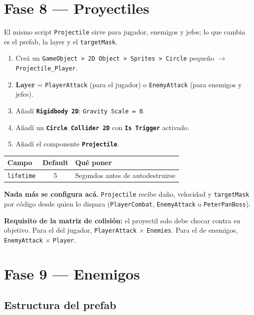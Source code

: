 \documentclass[a4paper,12pt]{article}
\newcommand{\code}[1]{\texttt{#1}}
\begin{document}
\section{Fase 8 --- Proyectiles}

El mismo script \code{Projectile} sirve para jugador, enemigos y jefes; lo que cambia es el
prefab, la layer y el \code{targetMask}.

\begin{enumerate}
    \item Creá un \code{GameObject > 2D Object > Sprites > Circle} pequeño $\to$ \code{Projectile\_Player}.
    \item \textbf{Layer} = \code{PlayerAttack} (para el jugador) o \code{EnemyAttack} (para enemigos y jefes).
    \item Añadí \textbf{\code{Rigidbody 2D}}: \code{Gravity Scale = 0}.
    \item Añadí un \textbf{\code{Circle Collider 2D}} con \textbf{\code{Is Trigger}} activado.
    \item Añadí el componente \textbf{\code{Projectile}}.
\end{enumerate}

\begin{center}
\begin{tabular}{|l|c|p{7.6cm}|}
\hline
\textbf{Campo} & \textbf{Default} & \textbf{Qué poner} \\
\hline
\code{lifetime} & 5 & Segundos antes de autodestruirse \\
\hline
\end{tabular}
\end{center}

\textbf{Nada más se configura acá.} \code{Projectile} recibe daño, velocidad y \code{targetMask}
por código desde quien lo dispara (\code{PlayerCombat}, \code{EnemyAttack} o \code{PeterPanBoss}).

\textbf{Requisito de la matriz de colisión:} el proyectil solo debe chocar contra su objetivo.
Para el del jugador, \code{PlayerAttack} $\times$ \code{Enemies}. Para el de enemigos,
\code{EnemyAttack} $\times$ \code{Player}.

\section{Fase 9 --- Enemigos}

\subsection{Estructura del prefab}
\end{document}
